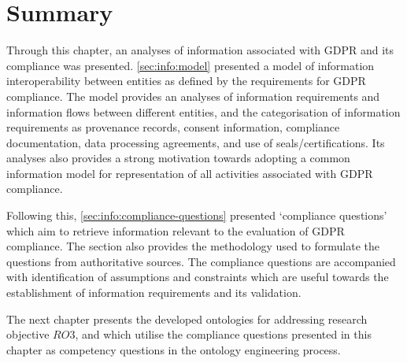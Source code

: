\section*{Summary}
Through this chapter, an analyses of information associated with GDPR and its compliance was presented. 
\autoref{sec:info:model} presented a model of information interoperability between entities as defined by the requirements for GDPR compliance. The model provides an analyses of information requirements and information flows between different entities, and the categorisation of information requirements as provenance records, consent information, compliance documentation, data processing agreements, and use of seals/certifications.
Its analyses also provides a strong motivation towards adopting a common information model for representation of all activities associated with GDPR compliance.

Following this, \autoref{sec:info:compliance-questions} presented `compliance questions' which aim to retrieve information relevant to the evaluation of GDPR compliance. The section also provides the methodology used to formulate the questions from authoritative sources. The compliance questions are accompanied with identification of assumptions and constraints which are useful towards the establishment of information requirements and its validation.

The next chapter presents the developed ontologies for addressing research objective $RO3$, and which utilise the compliance questions presented in this chapter as competency questions in the ontology engineering process.